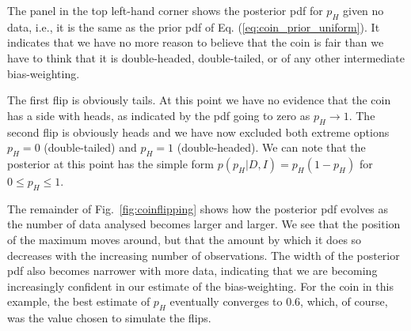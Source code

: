 \documentclass[%
oneside,                 %
final,                   %
10pt]{article}
\begin{document}
The panel in the top left-hand corner shows the posterior pdf for $p_H$ given no data, i.e., it is the same as the prior pdf of Eq. (\ref{eq:coin_prior_uniform}). It indicates that we have no more reason to believe that the coin is fair than we have to think that it is double-headed, double-tailed, or of any other intermediate bias-weighting.

The first flip is obviously tails. At this point we have no evidence that the coin has a side with heads, as indicated by the pdf going to zero as $p_H \to 1$. The second flip is obviously heads and we have now excluded both extreme options $p_H=0$ (double-tailed) and $p_H=1$ (double-headed). We can note that the posterior at this point has the simple form $p(p_H|D,I) = p_H(1-p_H)$ for $0 \le p_H \le 1$.

The remainder of Fig.~\ref{fig:coinflipping} shows how the posterior pdf evolves as the number of data analysed becomes larger and larger. We see that the position of the maximum moves around, but that the amount by which it does so decreases with the increasing number of observations. The width of the posterior pdf also becomes narrower with more data, indicating that we are becoming increasingly confident in our estimate of the bias-weighting. For the coin in this example, the best estimate of $p_H$ eventually converges to 0.6, which, of course, was the value chosen to simulate the flips.


\end{document}
